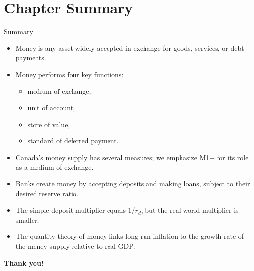 \documentclass[aspectratio=169]{beamer}
\begin{document}
\section*{Chapter Summary}

\begin{frame}{Summary}
\transfade
\begin{itemize}
  \item Money is any asset widely accepted in exchange for goods, services, or debt payments.
  \item Money performs four key functions:
  \begin{itemize}
    \item medium of exchange,
    \item unit of account,
    \item store of value,
    \item standard of deferred payment.
  \end{itemize}
  \item Canada’s money supply has several measures; we emphasize M1+ for its role as a medium of exchange.
  \item Banks create money by accepting deposits and making loans, subject to their desired reserve ratio.
  \item The simple deposit multiplier equals \(1 / r_{d}\), but the real-world multiplier is smaller.
  \item The quantity theory of money links long-run inflation to the growth rate of the money supply relative to real GDP.
\end{itemize}
\end{frame}

\begin{frame}
\centering
\Huge \textbf{Thank you!}
\end{frame}
\end{document}
